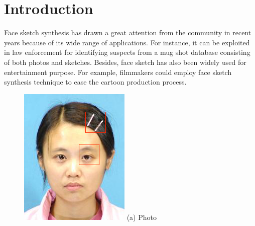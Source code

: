 \documentclass[10pt,twocolumn,letterpaper]{article}
\begin{document}
\section{Introduction}

Face sketch synthesis has drawn a great attention from the community in recent years because of its wide range of applications. For instance, it can be exploited in law enforcement for identifying suspects from a mug shot database consisting of both photos and sketches. Besides, face sketch has also been widely used for entertainment purpose. For example, filmmakers could employ face sketch synthesis technique to ease the cartoon production process.

\begin{figure}[t]
\centering
\begin{minipage}[t]{0.24\linewidth}
\centering
\includegraphics[width=1\linewidth]{img/example_photo.png}
(a) Photo
\end{minipage}
\begin{minipage}[t]{0.24\linewidth}

\end{minipage}
\end{figure}
\end{document}
